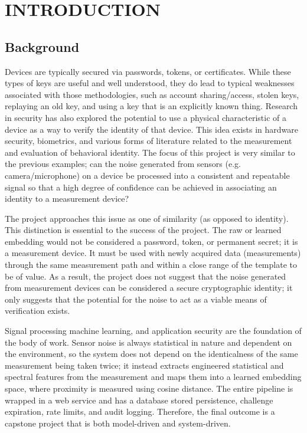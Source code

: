 \chapter{\MakeUppercase{Introduction}}
\justifying
\section{Background}
Devices are typically secured via passwords, tokens, or certificates. While these types of keys are useful and well understood, they do lead to typical weaknesses associated with those methodologies, such as account sharing/access, stolen keys, replaying an old key, and using a key that is an explicitly known thing. Research in security has also explored the potential to use a physical characteristic of a device as a way to verify the identity of that device. This idea exists in hardware security, biometrics, and various forms of literature related to the measurement and evaluation of behavioral identity. The focus of this project is very similar to the previous examples; can the noise generated from sensors (e.g. camera/microphone) on a device be processed into a consistent and repeatable signal so that a high degree of confidence can be achieved in associating an identity to a measurement device?

The project approaches this issue as one of similarity (as opposed to identity). This distinction is essential to the success of the project. The raw or learned embedding would not be considered a password, token, or permanent secret; it is a measurement device. It must be used with newly acquired data (measurements) through the same measurement path and within a close range of the template to be of value. As a result, the project does not suggest that the noise generated from measurement devices can be considered a secure cryptographic identity; it only suggests that the potential for the noise to act as a viable means of verification exists.

Signal processing machine learning, and application security are the foundation of the body of work. Sensor noise is always statistical in nature and dependent on the environment, so the system does not depend on the identicalness of the same measurement being taken twice; it instead extracts engineered statistical and spectral features from the measurement and maps them into a learned embedding space, where proximity is measured using cosine distance. The entire pipeline is wrapped in a web service and has a database stored persistence, challenge expiration, rate limits, and audit logging. Therefore, the final outcome is a capstone project that is both model-driven and system-driven.

